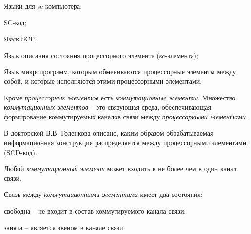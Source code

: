 Языки для sc-компьютера:
\begin{textitemize}
	\item SC-код;
	\item Язык SCP;
	\item Язык описания состояния процессорного элемента (sc-элемента);
	\item Язык микропрограмм, которым обмениваются процессорные элементы между собой, и которые исполняются этими процессорными элементами.
\end{textitemize}

Кроме \textit{процессорных элементов} есть \textit{коммутационные элементы}. Множество \textit{коммутационных элементов} -- это связующая среда, обеспечивающая формирование коммутируемых каналов связи между \textit{процессорными элементами}. 

В докторской В.В. Голенкова описано, каким образом обрабатываемая информационная конструкция распределяется между процессорными элементами (SCD-код).

Любой \textit{коммутационный элемент} может входить в не более чем в один канал связи. %

Связь между \textit{коммутационными элементами} имеет два состояния:
\begin{textitemize}
	\item свободна -- не входит в состав коммутируемого канала связи;
	\item занята -- является звеном в канале связи.
\end{textitemize}